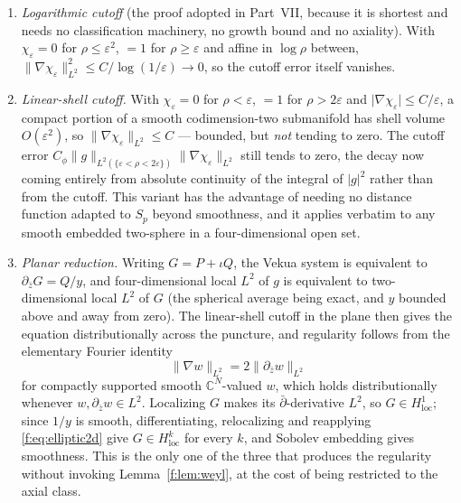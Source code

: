 \documentclass[11pt,a4paper]{article}
\numberwithin{equation}{section}
\theoremstyle{definition}
\theoremstyle{remark}
\theoremstyle{plain}
\newcommand{\CC}{\mathbb C}
\newcommand{\Sp}{S_{p}}
\newcommand{\abs}[1]{\lvert #1\rvert}
\newcommand{\norm}[1]{\lVert #1\rVert}
\begin{document}
\begin{enumerate}[label=\textup{(C\arabic*)}]
\item \emph{Logarithmic cutoff} (the proof adopted in Part~VII, because it
is shortest and needs no classification machinery, no growth bound and no
axiality). With $\chi_\varepsilon=0$ for $\rho\le\varepsilon^2$, $=1$ for
$\rho\ge\varepsilon$ and affine in $\log\rho$ between,
$\norm{\nabla\chi_\varepsilon}^2_{L^2}\le C/\log(1/\varepsilon)\to0$, so
the cutoff error itself vanishes.
\item \emph{Linear-shell cutoff.} With $\chi_\varepsilon=0$ for
$\rho<\varepsilon$, $=1$ for $\rho>2\varepsilon$ and
$\abs{\nabla\chi_\varepsilon}\le C/\varepsilon$, a compact portion of a
smooth codimension-two submanifold has shell volume $O(\varepsilon^2)$, so
$\norm{\nabla\chi_\varepsilon}_{L^2}\le C$ --- bounded, but \emph{not}
tending to zero. The cutoff error
$C_\phi\norm g_{L^2(\{\varepsilon<\rho<2\varepsilon\})}
\norm{\nabla\chi_\varepsilon}_{L^2}$ still tends to zero, the decay now
coming entirely from absolute continuity of the integral of $\abs g^2$
rather than from the cutoff. This variant has the advantage of needing no
distance function adapted to $\Sp$ beyond smoothness, and it applies
verbatim to any smooth embedded two-sphere in a four-dimensional open set.
\item \emph{Planar reduction.} Writing $G=P+\iota Q$, the Vekua system is
equivalent to $\partial_{\bar z}G=Q/y$, and four-dimensional local $L^2$ of
$g$ is equivalent to two-dimensional local $L^2$ of $G$ (the spherical
average being exact, and $y$ bounded above and away from zero). The
linear-shell cutoff in the plane then gives the equation distributionally
across the puncture, and regularity follows from the elementary Fourier
identity
\begin{equation}
 \norm{\nabla w}_{L^2}=2\norm{\partial_{\bar z}w}_{L^2}
 \label{f:eq:elliptic2d}
\end{equation}
for compactly supported smooth $\CC^N$-valued $w$, which holds
distributionally whenever $w,\partial_{\bar z}w\in L^2$. Localizing $G$
makes its $\bar\partial$-derivative $L^2$, so $G\in H^1_{\mathrm{loc}}$;
since $1/y$ is smooth, differentiating, relocalizing and reapplying
\eqref{f:eq:elliptic2d} give $G\in H^k_{\mathrm{loc}}$ for every $k$, and
Sobolev embedding gives smoothness. This is the only one of the three that
produces the regularity without invoking Lemma~\ref{f:lem:weyl}, at the
cost of being restricted to the axial class.
\end{enumerate}
\end{document}

